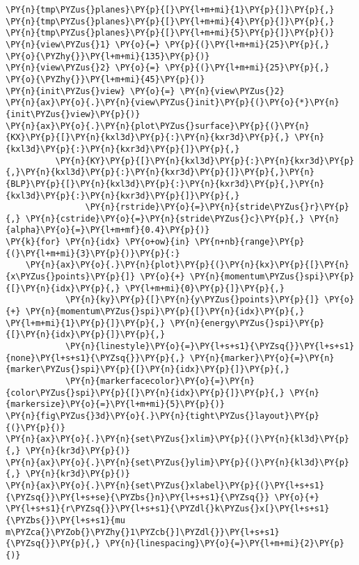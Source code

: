 \begin{Verbatim}[commandchars=\\\{\}]
                    \PY{n}{tmp\PYZus{}planes}\PY{p}{[}\PY{l+m+mi}{1}\PY{p}{]}\PY{p}{,} \PY{n}{tmp\PYZus{}planes}\PY{p}{[}\PY{l+m+mi}{4}\PY{p}{]}\PY{p}{,} \PY{n}{tmp\PYZus{}planes}\PY{p}{[}\PY{l+m+mi}{5}\PY{p}{]}\PY{p}{)}
\PY{n}{view\PYZus{}1} \PY{o}{=} \PY{p}{(}\PY{l+m+mi}{25}\PY{p}{,} \PY{o}{\PYZhy{}}\PY{l+m+mi}{135}\PY{p}{)}
\PY{n}{view\PYZus{}2} \PY{o}{=} \PY{p}{(}\PY{l+m+mi}{25}\PY{p}{,} \PY{o}{\PYZhy{}}\PY{l+m+mi}{45}\PY{p}{)}
\PY{n}{init\PYZus{}view} \PY{o}{=} \PY{n}{view\PYZus{}2}
\PY{n}{ax}\PY{o}{.}\PY{n}{view\PYZus{}init}\PY{p}{(}\PY{o}{*}\PY{n}{init\PYZus{}view}\PY{p}{)}
\PY{n}{ax}\PY{o}{.}\PY{n}{plot\PYZus{}surface}\PY{p}{(}\PY{n}{KX}\PY{p}{[}\PY{n}{kxl3d}\PY{p}{:}\PY{n}{kxr3d}\PY{p}{,} \PY{n}{kxl3d}\PY{p}{:}\PY{n}{kxr3d}\PY{p}{]}\PY{p}{,}
          \PY{n}{KY}\PY{p}{[}\PY{n}{kxl3d}\PY{p}{:}\PY{n}{kxr3d}\PY{p}{,}\PY{n}{kxl3d}\PY{p}{:}\PY{n}{kxr3d}\PY{p}{]}\PY{p}{,}\PY{n}{BLP}\PY{p}{[}\PY{n}{kxl3d}\PY{p}{:}\PY{n}{kxr3d}\PY{p}{,}\PY{n}{kxl3d}\PY{p}{:}\PY{n}{kxr3d}\PY{p}{]}\PY{p}{,}
                \PY{n}{rstride}\PY{o}{=}\PY{n}{stride\PYZus{}r}\PY{p}{,} \PY{n}{cstride}\PY{o}{=}\PY{n}{stride\PYZus{}c}\PY{p}{,} \PY{n}{alpha}\PY{o}{=}\PY{l+m+mf}{0.4}\PY{p}{)}
\PY{k}{for} \PY{n}{idx} \PY{o+ow}{in} \PY{n+nb}{range}\PY{p}{(}\PY{l+m+mi}{3}\PY{p}{)}\PY{p}{:}
    \PY{n}{ax}\PY{o}{.}\PY{n}{plot}\PY{p}{(}\PY{n}{kx}\PY{p}{[}\PY{n}{x\PYZus{}points}\PY{p}{]} \PY{o}{+} \PY{n}{momentum\PYZus{}spi}\PY{p}{[}\PY{n}{idx}\PY{p}{,} \PY{l+m+mi}{0}\PY{p}{]}\PY{p}{,}
            \PY{n}{ky}\PY{p}{[}\PY{n}{y\PYZus{}points}\PY{p}{]} \PY{o}{+} \PY{n}{momentum\PYZus{}spi}\PY{p}{[}\PY{n}{idx}\PY{p}{,} \PY{l+m+mi}{1}\PY{p}{]}\PY{p}{,} \PY{n}{energy\PYZus{}spi}\PY{p}{[}\PY{n}{idx}\PY{p}{]}\PY{p}{,}
            \PY{n}{linestyle}\PY{o}{=}\PY{l+s+s1}{\PYZsq{}}\PY{l+s+s1}{none}\PY{l+s+s1}{\PYZsq{}}\PY{p}{,} \PY{n}{marker}\PY{o}{=}\PY{n}{marker\PYZus{}spi}\PY{p}{[}\PY{n}{idx}\PY{p}{]}\PY{p}{,}
            \PY{n}{markerfacecolor}\PY{o}{=}\PY{n}{color\PYZus{}spi}\PY{p}{[}\PY{n}{idx}\PY{p}{]}\PY{p}{,} \PY{n}{markersize}\PY{o}{=}\PY{l+m+mi}{5}\PY{p}{)}
\PY{n}{fig\PYZus{}3d}\PY{o}{.}\PY{n}{tight\PYZus{}layout}\PY{p}{(}\PY{p}{)}
\PY{n}{ax}\PY{o}{.}\PY{n}{set\PYZus{}xlim}\PY{p}{(}\PY{n}{kl3d}\PY{p}{,} \PY{n}{kr3d}\PY{p}{)}
\PY{n}{ax}\PY{o}{.}\PY{n}{set\PYZus{}ylim}\PY{p}{(}\PY{n}{kl3d}\PY{p}{,} \PY{n}{kr3d}\PY{p}{)}
\PY{n}{ax}\PY{o}{.}\PY{n}{set\PYZus{}xlabel}\PY{p}{(}\PY{l+s+s1}{\PYZsq{}}\PY{l+s+se}{\PYZbs{}n}\PY{l+s+s1}{\PYZsq{}} \PY{o}{+} \PY{l+s+s1}{r\PYZsq{}}\PY{l+s+s1}{\PYZdl{}k\PYZus{}x[}\PY{l+s+s1}{\PYZbs{}}\PY{l+s+s1}{mu m\PYZca{}\PYZob{}\PYZhy{}1\PYZcb{}]\PYZdl{}}\PY{l+s+s1}{\PYZsq{}}\PY{p}{,} \PY{n}{linespacing}\PY{o}{=}\PY{l+m+mi}{2}\PY{p}{)}

\end{Verbatim}
